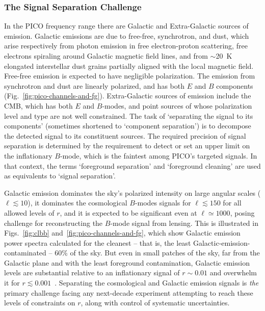 \documentclass[PICOReport.tex]{subfiles}
\begin{document}

\subsubsection{The Signal Separation Challenge}
\label{sec:separation_challenge}

In the PICO frequency range there are Galactic and Extra-Galactic sources of emission. Galactic emissions are due to free-free, synchrotron, and dust, which arise respectively from photon emission in free electron-proton scattering, free electrons spiraling around Galactic magnetic field lines, and from $\sim$20~K elongated interstellar dust grains partially aligned with the local magnetic field. Free-free emission is expected to have negligible polarization. The emission from synchrotron and dust are linearly polarized, and has both $E$ and $B$ components (Fig.~\ref{fig:pico-channels-and-fg}).  Extra-Galactic sources of emission include the CMB, which has both $E$ and $B$-modes, and point sources of %
whose polarization level and type are not well constrained. The task of `separating the signal to its components' (sometimes shortened to `component separation') is to decompose the detected signal to its constituent sources. The required precision of signal separation is determined by the requirement to detect or set an upper limit on the inflationary $B$-mode, which is the faintest among PICO's targeted signals. In that context, the terms `foreground separation' and `foreground cleaning' are used as equivalents to `signal separation'. 

Galactic emission dominates the sky's polarized intensity on large angular scales ($\ell \lesssim 10$), it dominates the cosmological $B$-modes signals for $\ell \lesssim 150$ for all allowed levels of $r$, and it is expected to be significant even at $\ell \simeq 1000$, posing challenge for reconstructing the $B$-mode signal from lensing. This is illustrated in Figs.~\ref{fig:clbb} and~\ref{fig:pico-channels-and-fg}, which show Galactic emission power spectra calculated for the cleanest -- that is, the least Galactic-emission-contaminated -- 60\% of the sky. But even in small patches of the sky, far from the Galactic plane and with the least foreground contamination, Galactic emission levels are substantial relative to an inflationary signal of $r \sim 0.01$ and overwhelm it for $r \lesssim 0.001$~\cite{planckEB}. Separating the cosmological and Galactic emission signals is {\it the} primary challenge facing any next-decade experiment attempting to reach these levels of constraints on $r$, along with control of systematic uncertainties.
\end{document}
